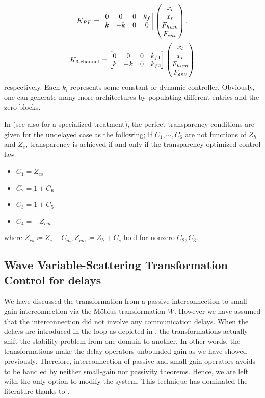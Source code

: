 \[
K_{PF} = \begin{bmatrix}
0&0&0&k_f\\
k&-k&0&0
\end{bmatrix}\begin{pmatrix}x_l\\x_r\\F_{hum}\\F_{env}\end{pmatrix},
\]
\[
K_{3\text{-channel}} = \begin{bmatrix}
0&0&0&k_{f1}\\
k&-k&0&k_{f2}
\end{bmatrix}\begin{pmatrix}x_l\\x_r\\F_{hum}\\F_{env}\end{pmatrix}
\]
respectively. Each $k_i$ represents some constant or dynamic controller. Obviously, one can 
generate many more architectures by populating different entries and the zero blocks. 

In \cite{hashzaad2002} (see also \cite{rajuverg} for a specialized treatment), the perfect transparency conditions are given for the 
undelayed case as the following; If $C_1,\cdots,C_6$ are not functions of $Z_h$ and $Z_e$, transparency is achieved if and only if the 
transparency-optimized control law

\begin{itemize}
	\item $C_1=Z_{cs}$
    \item $C_2 = 1 + C_6$
    \item $C_3 = 1 + C_5$
    \item $C_4 = -Z_{cm}$
\end{itemize}
where $Z_{cs} \coloneqq Z_e + C_m,Z_{cm} \coloneqq Z_h + C_s$ hold for nonzero $C_2,C_3$.

\subsection{Wave Variable-Scattering Transformation Control for delays}

We have discussed the transformation from a passive interconnection to small-gain interconnection via
the M\"{o}bius transformation $W$. However we have assumed that the interconnection did not involve any 
communication delays. When the delays are introduced in the loop as depicted in , 
the transformations actually shift the stability problem from one domain to another. In other words, 
the transformations make the delay operators unbounded-gain as we have showed previously. Therefore, 
interconnection of passive and small-gain operators avoids to be handled by neither small-gain nor 
passivity theorems. Hence, we are left with the only option to modify the system. This technique has 
dominated the literature thanks to \cite{andersonspong,nieslotine, nieslotine2}. 

